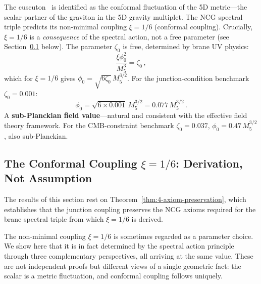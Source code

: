 The cuscuton~\cite{ch4:Afshordi2007} is identified as the conformal fluctuation of the 5D metric---the scalar partner of the graviton in the 5D gravity multiplet. The NCG spectral triple predicts its non-minimal coupling $\xi = 1/6$ (conformal coupling). Crucially, $\xi = 1/6$ is a \emph{consequence} of the spectral action, not a free parameter (see Section~\ref{sec:4-xi-derivation} below). The parameter $\zeta_0$ is free, determined by brane UV physics:
\begin{equation}
  \frac{\xi\phi_0^2}{M_5^3} = \zeta_0\,,
  \label{eq:4-66}
\end{equation}
which for $\xi = 1/6$ gives $\phi_0 = \sqrt{6\zeta_0}\, M_5^{3/2}$. For the junction-condition benchmark $\zeta_0 = 0.001$:
\begin{equation}
  \phi_0 = \sqrt{6 \times 0.001}\, M_5^{3/2} = 0.077\, M_5^{3/2}\,.
  \label{eq:4-67}
\end{equation}
A \textbf{sub-Planckian field value}---natural and consistent with the effective field theory framework. For the CMB-constraint benchmark $\zeta_0 = 0.037$, $\phi_0 = 0.47\, M_5^{3/2}$, also sub-Planckian.


\subsection{The Conformal Coupling \texorpdfstring{$\xi = 1/6$}{xi = 1/6}: Derivation, Not Assumption}
\label{sec:4-xi-derivation}

The results of this section rest on Theorem~\ref{thm:4-axiom-preservation}, which establishes that the junction coupling preserves the NCG axioms required for the brane spectral triple from which $\xi = 1/6$ is derived.

The non-minimal coupling $\xi = 1/6$ is sometimes regarded as a parameter choice. We show here that it is in fact determined by the spectral action principle through three complementary perspectives, all arriving at the same value. These are not independent proofs but different views of a single geometric fact: the scalar is a metric fluctuation, and conformal coupling follows uniquely.

